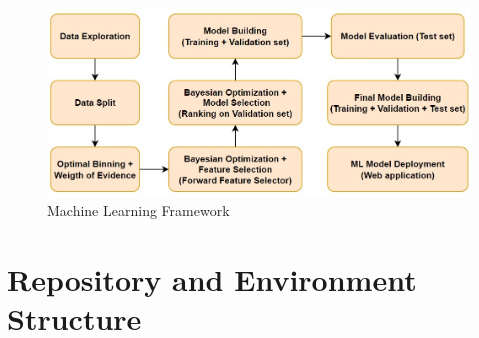     \begin{figure}[H]
        \centering
        \caption{Machine Learning Framework}\vspace{0.5em}
        \label{fig:mlframe}
        \includegraphics[width=120mm]{Figures/ml_framework.jpg}

        \vspace{-1em}
    \end{figure}

    \section{Repository and Environment Structure}

